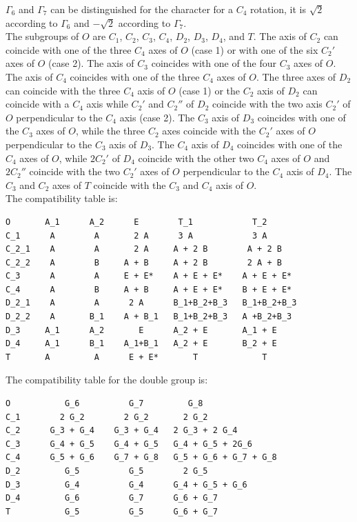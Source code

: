 \documentclass[12pt,a4paper]{article}
\begin{document}
$\Gamma_6$ and $\Gamma_7$ can be distinguished for the character for a
$C_4$ rotation, it is $\sqrt{2}$ according to $\Gamma_6$ and $-\sqrt{2}$
according to $\Gamma_7$. \\
The subgroups of $O$ are $C_1$, $C_2$, $C_3$, $C_4$, $D_2$, $D_3$, $D_4$, and 
$T$. The axis of $C_2$ can coincide with one of the three $C_4$ axes of $O$
(case 1) or with one of the six $C_2'$ axes of $O$ (case 2). The axis of $C_3$ 
coincides with one of the four $C_3$ axes of $O$. The axis of $C_4$ 
coincides with one of the three $C_4$ axes of $O$. The three axes of $D_2$
can coincide with the three $C_4$ axis of $O$ (case 1) or the $C_2$ axis of
$D_2$ can coincide with a $C_4$ axis while $C_2'$ and $C_2''$ of $D_2$ 
coincide with the two axis $C_2'$ of $O$ perpendicular to the $C_4$ axis 
(case 2). The $C_3$ axis of $D_3$ coincides with one of the $C_3$ axes of $O$, while
the three $C_2$ axes coincide with the $C_2'$ axes of $O$ perpendicular to
the $C_3$ axis of $D_3$. The $C_4$ axis of $D_4$ coincides with one of the $C_4$
axes of $O$, while $2C_2'$ of $D_4$ coincide with the other two $C_4$ 
axes of $O$ and $2C_2''$ coincide with the two $C_2'$ axes of $O$ perpendicular
to the $C_4$ axis of $D_4$. The $C_3$ and $C_2$ axes of $T$ coincide with
the $C_3$ and $C_4$ axis of $O$. \\
The compatibility table is:
\begin{verbatim}
O       A_1      A_2      E        T_1            T_2
C_1      A        A       2 A      3 A            3 A
C_2_1    A        A       2 A     A + 2 B        A + 2 B
C_2_2    A        B     A + B     A + 2 B        2 A + B
C_3      A        A     E + E*    A + E + E*    A + E + E*
C_4      A        B     A + B     A + E + E*    B + E + E*
D_2_1    A        A      2 A      B_1+B_2+B_3   B_1+B_2+B_3 
D_2_2    A       B_1    A + B_1   B_1+B_2+B_3   A +B_2+B_3
D_3     A_1      A_2       E      A_2 + E       A_1 + E
D_4     A_1      B_1    A_1+B_1   A_2 + E       B_2 + E
T       A         A      E + E*       T             T
\end{verbatim}
The compatibility table for the double group is:
\begin{verbatim}
O           G_6          G_7         G_8
C_1        2 G_2        2 G_2       2 G_2
C_2      G_3 + G_4    G_3 + G_4   2 G_3 + 2 G_4
C_3      G_4 + G_5    G_4 + G_5   G_4 + G_5 + 2G_6  
C_4      G_5 + G_6    G_7 + G_8   G_5 + G_6 + G_7 + G_8
D_2         G_5          G_5        2 G_5
D_3         G_4          G_4      G_4 + G_5 + G_6
D_4         G_6          G_7      G_6 + G_7
T           G_5          G_5      G_6 + G_7 
\end{verbatim}
\end{document}
